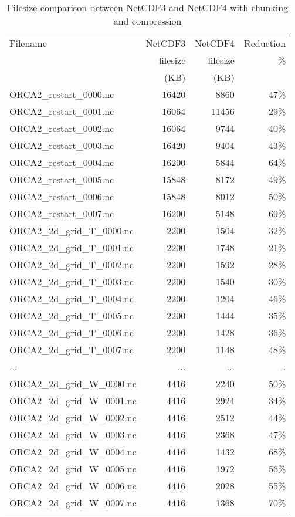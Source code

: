 \documentclass[NEMO_book]{subfiles}
\begin{document}
\begin{table} 	\begin{tabular}{lrrr}
Filename & NetCDF3 & NetCDF4 & Reduction\\
         &filesize & filesize & \% \\
         &(KB)     & (KB)     & \\
ORCA2\_restart\_0000.nc & 16420 & 8860 & 47\%\\
ORCA2\_restart\_0001.nc & 16064 & 11456 & 29\%\\
ORCA2\_restart\_0002.nc & 16064 & 9744 & 40\%\\
ORCA2\_restart\_0003.nc & 16420 & 9404 & 43\%\\
ORCA2\_restart\_0004.nc & 16200 & 5844 & 64\%\\
ORCA2\_restart\_0005.nc & 15848 & 8172 & 49\%\\
ORCA2\_restart\_0006.nc & 15848 & 8012 & 50\%\\
ORCA2\_restart\_0007.nc & 16200 & 5148 & 69\%\\
ORCA2\_2d\_grid\_T\_0000.nc & 2200 & 1504 & 32\%\\
ORCA2\_2d\_grid\_T\_0001.nc & 2200 & 1748 & 21\%\\
ORCA2\_2d\_grid\_T\_0002.nc & 2200 & 1592 & 28\%\\
ORCA2\_2d\_grid\_T\_0003.nc & 2200 & 1540 & 30\%\\
ORCA2\_2d\_grid\_T\_0004.nc & 2200 & 1204 & 46\%\\
ORCA2\_2d\_grid\_T\_0005.nc & 2200 & 1444 & 35\%\\
ORCA2\_2d\_grid\_T\_0006.nc & 2200 & 1428 & 36\%\\
ORCA2\_2d\_grid\_T\_0007.nc & 2200 & 1148 & 48\%\\
             ...            &  ... &  ... & ..  \\
ORCA2\_2d\_grid\_W\_0000.nc & 4416 & 2240 & 50\%\\
ORCA2\_2d\_grid\_W\_0001.nc & 4416 & 2924 & 34\%\\
ORCA2\_2d\_grid\_W\_0002.nc & 4416 & 2512 & 44\%\\
ORCA2\_2d\_grid\_W\_0003.nc & 4416 & 2368 & 47\%\\
ORCA2\_2d\_grid\_W\_0004.nc & 4416 & 1432 & 68\%\\
ORCA2\_2d\_grid\_W\_0005.nc & 4416 & 1972 & 56\%\\
ORCA2\_2d\_grid\_W\_0006.nc & 4416 & 2028 & 55\%\\
ORCA2\_2d\_grid\_W\_0007.nc & 4416 & 1368 & 70\%\\
\end{tabular}
\caption{ 	\label{Tab_NC4} 
Filesize comparison between NetCDF3 and NetCDF4 with chunking and compression}
\end{table}
\end{document}
